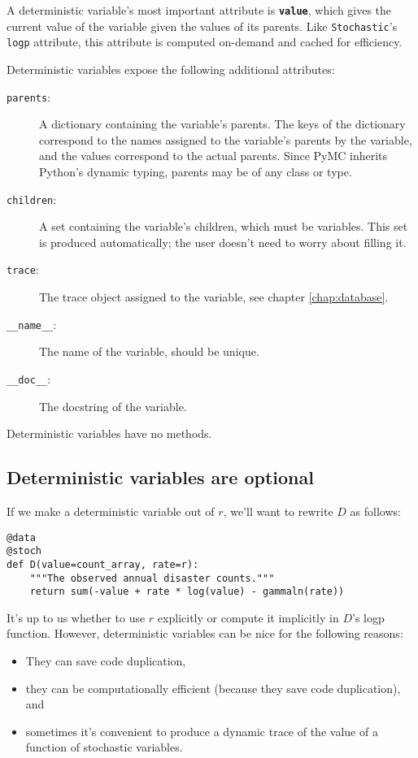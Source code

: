 A deterministic variable's most important attribute is \texttt{\bfseries value}, which gives the current value of the variable given the values of its parents. Like \texttt{Stochastic}'s \texttt{logp} attribute, this attribute is computed on-demand and cached for efficiency.

Deterministic variables expose the following additional attributes:
\begin{description}
    \item[\texttt{parents}:] A dictionary containing the variable's parents. The keys of the dictionary correspond to the names assigned to the variable's parents by the variable, and the values correspond to the actual parents. Since PyMC inherits Python's dynamic typing, parents may be of any class or type.
    \item[\texttt{children}:] A set containing the variable's children, which must be variables. This set is produced automatically; the user doesn't need to worry about filling it.
    \item[\texttt{trace}:] The trace object assigned to the variable, see chapter \ref{chap:database}.
    \item[\texttt{__name__}:] The name of the variable, should be unique.
    \item[\texttt{__doc__}:] The docstring of the variable.
\end{description}
Deterministic variables have no methods.

\subsection{Deterministic variables are optional}
If we make a deterministic variable out of $r$, we'll want to rewrite $D$ as follows:
\begin{verbatim}
@data
@stoch
def D(value=count_array, rate=r):
    """The observed annual disaster counts."""
    return sum(-value + rate * log(value) - gammaln(rate))
\end{verbatim}
It's up to us whether to use $r$ explicitly or compute it implicitly in $D$'s logp function. However, deterministic variables can be nice for the following reasons:
\begin{itemize}
    \item They can save code duplication,    
    \item they can be computationally efficient (because they save code duplication), and
    \item sometimes it's convenient to produce a dynamic trace of the value of a function of stochastic variables.
\end{itemize}


